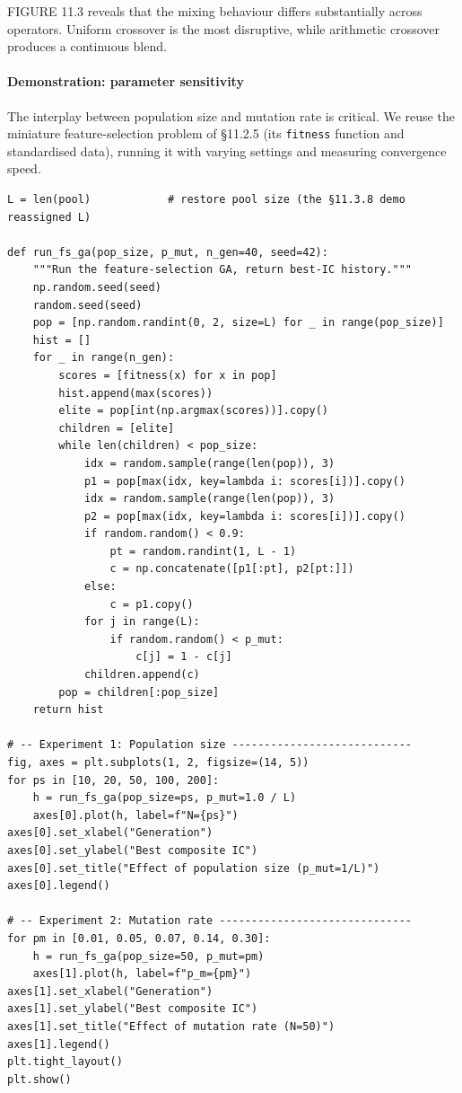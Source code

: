 FIGURE 11.3 reveals that the mixing behaviour differs substantially across operators. Uniform crossover is the most disruptive, while arithmetic crossover produces a continuous blend.

\paragraph{Demonstration: parameter sensitivity}

The interplay between population size and mutation rate is critical. We reuse the miniature feature-selection problem of §11.2.5 (its \texttt{fitness} function and standardised data), running it with varying settings and measuring convergence speed.

\begin{verbatim}
L = len(pool)            # restore pool size (the §11.3.8 demo reassigned L)

def run_fs_ga(pop_size, p_mut, n_gen=40, seed=42):
    """Run the feature-selection GA, return best-IC history."""
    np.random.seed(seed)
    random.seed(seed)
    pop = [np.random.randint(0, 2, size=L) for _ in range(pop_size)]
    hist = []
    for _ in range(n_gen):
        scores = [fitness(x) for x in pop]
        hist.append(max(scores))
        elite = pop[int(np.argmax(scores))].copy()
        children = [elite]
        while len(children) < pop_size:
            idx = random.sample(range(len(pop)), 3)
            p1 = pop[max(idx, key=lambda i: scores[i])].copy()
            idx = random.sample(range(len(pop)), 3)
            p2 = pop[max(idx, key=lambda i: scores[i])].copy()
            if random.random() < 0.9:
                pt = random.randint(1, L - 1)
                c = np.concatenate([p1[:pt], p2[pt:]])
            else:
                c = p1.copy()
            for j in range(L):
                if random.random() < p_mut:
                    c[j] = 1 - c[j]
            children.append(c)
        pop = children[:pop_size]
    return hist

# -- Experiment 1: Population size ----------------------------
fig, axes = plt.subplots(1, 2, figsize=(14, 5))
for ps in [10, 20, 50, 100, 200]:
    h = run_fs_ga(pop_size=ps, p_mut=1.0 / L)
    axes[0].plot(h, label=f"N={ps}")
axes[0].set_xlabel("Generation")
axes[0].set_ylabel("Best composite IC")
axes[0].set_title("Effect of population size (p_mut=1/L)")
axes[0].legend()

# -- Experiment 2: Mutation rate ------------------------------
for pm in [0.01, 0.05, 0.07, 0.14, 0.30]:
    h = run_fs_ga(pop_size=50, p_mut=pm)
    axes[1].plot(h, label=f"p_m={pm}")
axes[1].set_xlabel("Generation")
axes[1].set_ylabel("Best composite IC")
axes[1].set_title("Effect of mutation rate (N=50)")
axes[1].legend()
plt.tight_layout()
plt.show()
\end{verbatim}

